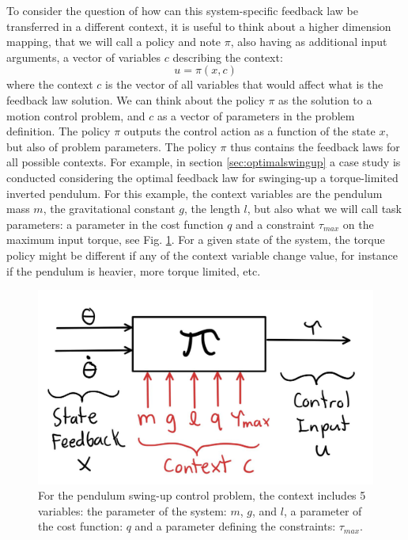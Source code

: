 To consider the question of how can this system-specific feedback law be transferred in a different context, it is useful to think about a higher dimension mapping, that we will call a policy and note $\pi$, also having as additional input arguments, a vector of variables $c$ describing the context:
\begin{equation}
u
=
\pi \left(
x,
c
\right)
\end{equation}
where the context $c$ is the vector of all variables that would affect what is the feedback law solution. We can think about the policy $\pi$ as the solution to a motion control problem, and $c$ as a vector of parameters in the problem definition. The policy $\pi$ outputs the control action as a function of the state $x$, but also of problem parameters. The policy $\pi$ thus contains the feedback laws for all possible contexts. For example, in section \ref{sec:optimalswingup} a case study is conducted considering the optimal feedback law for swinging-up a torque-limited inverted pendulum. For this example, the context variables are the pendulum mass $m$, the gravitational constant $g$, the length $l$, but also what we will call task parameters: a parameter in the cost function $q$ and a constraint $\tau_{max}$ on the maximum input torque, see Fig. \ref{fig:policy_context}. For a given state of the system, the torque policy might be different if any of the context variable change value, for instance if the pendulum is heavier, more torque limited, etc.
\begin{figure}[htb]
\vspace{-5pt}
\begin{center}
\includegraphics[width=0.75\linewidth]{fig/policy_context2.jpg}
\caption{For the pendulum swing-up control problem, the context includes 5 variables: the parameter of the system: $m$, $g$, and $l$, a parameter of the cost function: $q$ and a parameter defining the constraints: $\tau_{max}$. 
}\label{fig:policy_context}
\end{center}
\vspace{-5pt}
\end{figure}
